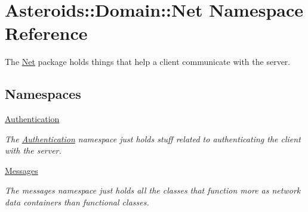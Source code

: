 \hypertarget{namespaceAsteroids_1_1Domain_1_1Net}{}\section{Asteroids\+:\+:Domain\+:\+:Net Namespace Reference}
\label{namespaceAsteroids_1_1Domain_1_1Net}


The \hyperlink{namespaceAsteroids_1_1Domain_1_1Net}{Net} package holds things that help a client communicate with the server.  


\subsection*{Namespaces}
\begin{DoxyCompactItemize}
\item 
 \hyperlink{namespaceAsteroids_1_1Domain_1_1Net_1_1Authentication}{Authentication}
\begin{DoxyCompactList}\small\item\em The \hyperlink{namespaceAsteroids_1_1Domain_1_1Net_1_1Authentication}{Authentication} namespace just holds stuff related to authenticating the client with the server. \end{DoxyCompactList}\item 
 \hyperlink{namespaceAsteroids_1_1Domain_1_1Net_1_1Messages}{Messages}
\begin{DoxyCompactList}\small\item\em The messages namespace just holds all the classes that function more as network data containers than functional classes. \end{DoxyCompactList}\end{DoxyCompactItemize}
